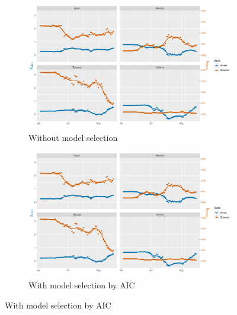 \documentclass[12pt]{article}
\begin{document}
\begin{appendices}
		\begin{figure}[H]
    	    \centering
    	    \begin{subfigure}{\textwidth}
    	      \centering
    	      \includegraphics[width=0.95\linewidth]{output/model3_lag3_betas_Centro (IT)_rolling.pdf}
    	      \caption{Without model selection}
    	      \label{fig:beta_within_between_over_time_centro_regular}
    	    \end{subfigure}\newline
    	    \begin{subfigure}{\textwidth}
    	      \centering
    	      \includegraphics[width=0.95\linewidth]{output/model3_lag3_betas_Centro (IT)_aic_rolling.pdf}
    	      \caption{With model selection by AIC}
    	      \label{fig:beta_within_between_over_time_centro_aic}
    	    \end{subfigure}
    	\end{figure}
        \begin{figure}[H]\ContinuedFloat
    	    \begin{subfigure}{\textwidth}
    	      \centering

\end{subfigure}
\end{figure}
\end{appendices}
\end{document}
